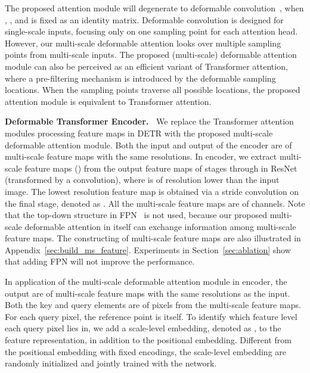 \documentclass{article}
\begin{document}
The proposed attention module will degenerate to deformable convolution~\citep{dai2017deformable}, when , , and  is fixed as an identity matrix. Deformable convolution is designed for single-scale inputs, focusing only on one sampling point for each attention head. However, our multi-scale deformable attention looks over multiple sampling points from multi-scale inputs. The proposed (multi-scale) deformable attention module can also be perceived as an efficient variant of Transformer attention, where a pre-filtering mechanism is introduced by the deformable sampling locations. When the sampling points traverse all possible locations, the proposed attention module is equivalent to Transformer attention.

\textbf{Deformable Transformer Encoder.~}
We replace the Transformer attention modules processing feature maps in DETR with the proposed multi-scale deformable attention module. Both the input and output of the encoder are of multi-scale feature maps with the same resolutions. In encoder, we extract multi-scale feature maps  () from the output feature maps of stages  through  in ResNet~\citep{he2016deep} (transformed by a  convolution), where  is of resolution  lower than the input image. The lowest resolution feature map  is obtained via a  stride  convolution on the final  stage, denoted as . All the multi-scale feature maps are of  channels. Note that the top-down structure in FPN~\citep{lin2017feature} is not used, because our proposed multi-scale deformable attention in itself can exchange information among multi-scale feature maps. The constructing of multi-scale feature maps are also illustrated in 
Appendix~\ref{sec:build_ms_feature}. Experiments in Section~\ref{sec:ablation} show that adding FPN will not improve the performance.

In application of the multi-scale deformable attention module in encoder, the output are of multi-scale feature maps with the same resolutions as the input. Both the key and query elements are of pixels from the multi-scale feature maps. For each query pixel, the reference point is itself.
To identify which feature level each query pixel lies in, we add a scale-level embedding, denoted as , to the feature representation, in addition to the positional embedding. Different from the positional embedding with fixed encodings, the scale-level embedding  are randomly initialized and jointly trained with the network. 
\end{document}

